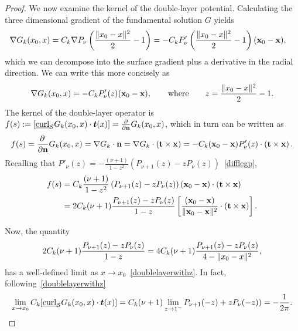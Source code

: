 \begin{proof}
We now examine the kernel of the double-layer potential. Calculating the
three dimensional gradient of the fundamental solution $G$ yields
\begin{align*}
  \nabla G_k(x_0,x) &= C_k \nabla P_\nu\left(
    \frac{\|x_0-x\|^2}{2}-1\right) = 
  -C_k P'_\nu\left(\frac{\|x_0-x\|^2}{2}-1\right)
    (\mathbf{x}_{0}-\mathbf{x}),
\end{align*}
which we can decompose into the surface gradient plus a derivative in
the radial direction. We can write this more concisely as
\begin{align*}
\nabla G_k(x_0,x)=-C_k P'_{\nu}(z) (\mathbf{x}_0-\mathbf{x}), 
  \qquad \mbox{where}\qquad z=\frac{\|{ x_0}-{x}\|^2}{2}-1.
\end{align*} 
The kernel of the double-layer operator is $f(s): =
[\underline{\mbox{curl}}_{\S}G_{k}(x_{0},x) \cdot \vec{t}(x)]=
\frac{\partial}{\partial \mathbf{n}} G_k({x}_{0},{x})$, which in turn
can be written as 
\begin{align*}
 f(s)=\frac{\partial \, }{\partial \mathbf{n}} G_{k}(x_{0},x) 
 =\nabla G_{k} \cdot \mathbf{n} = \nabla G_k\cdot \left( \mathbf{t}
 \times \mathbf{x} \right) 
 =-C_k (\mathbf{x}_0-\mathbf{x})P'_{\nu}(z)\cdot \left(
 \mathbf{t} \times \mathbf{x} \right).
\end{align*}
Recalling that $P'_{\nu}(z)=-\frac{(\nu+1)}{1-z^2}(P_{\nu+1}(z)-z
P_{\nu}(z))$~\eqref{difflegp},
\begin{align}
  f(s) &= C_k \frac{(\nu+1)}{1-z^2}\left(
  P_{\nu+1}(z)-zP_{\nu}(z)\right) 
  (\mathbf{x}_0-\mathbf{x})\cdot \left(
  \mathbf{t} \times {\mathbf x} \right) \nonumber\\
  &= 2C_k(\nu+1)\frac{P_{\nu+1}(z)-zP_{\nu}(z)}{1-z} \left[
  \frac{(\mathbf{x}_0-\mathbf{x})}{\|\mathbf{x}_{0}-\mathbf{x}\|^2}
  \cdot \left( \mathbf{t} \times \mathbf{x} \right)\right].
  \label{kern1}
\end{align} 

Now, the quantity
\begin{align*}
  2C_k(\nu+1)\frac{P_{\nu+1}(z)-zP_{\nu}(z)}{1-z}
  =4C_k(\nu+1)\frac{P_{\nu+1}(z)-zP_{\nu}(z)}{4-\|{x_0}-{x}\|^2},
\end{align*}
has a well-defined limit as $x \rightarrow
x_{0}$~\eqref{doublelayerwithz}. In fact,
following~\eqref{doublelayerwithz}
\begin{align*}
  \lim_{x\rightarrow x_0} 
  \C[\underline{\mbox{curl}}_{\S}G_{k}(x_{0},x) \cdot \vec{t}(x)] 
  = \C(\nu+1)\lim_{z\rightarrow 1^-}
  P_{\nu+1}(-z)+zP_{\nu}(-z)) = -\frac{1}{2\pi}.
\end{align*}


\end{proof}
